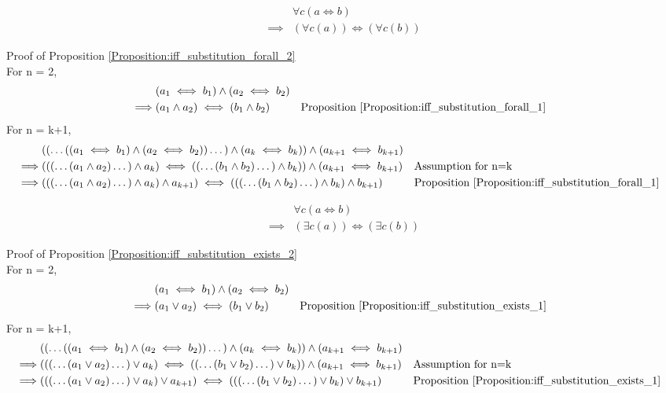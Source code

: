 \begin{prop}
\label{Proposition:iff_substitution_forall_2}
\begin{align*}
& \forall c (a \iff b) \\
\implies & (\forall c (a)) \iff (\forall c (b))
\end{align*}
\end{prop}

Proof of Proposition \ref{Proposition:iff_substitution_forall_2} \\
For n = 2,
\begin{align*}
& (a_1 \iff b_1) \land (a_2 \iff b_2) \\
\implies & (a_1 \land a_2) \iff (b_1 \land b_2)
& & \text{Proposition \ref{Proposition:iff_substitution_forall_1}} \\
\end{align*}
For n = k+1,
\begin{align*}
& (( \dots ((a_1 \iff b_1) \land (a_2 \iff b_2)) \dots ) \land (a_k \iff b_k)) \land (a_{k+1} \iff b_{k+1}) \\
\implies & ((( \dots (a_1 \land a_2) \dots ) \land a_k) \iff (( \dots (b_1 \land b_2) \dots ) \land b_k)) \land (a_{k+1} \iff b_{k+1})
& & \text{Assumption for n=k} \\
\implies & ((( \dots (a_1 \land a_2) \dots ) \land a_k) \land a_{k+1}) \iff ((( \dots (b_1 \land b_2) \dots ) \land b_k) \land b_{k+1})
& & \text{Proposition \ref{Proposition:iff_substitution_forall_1}} \\
\end{align*}

\begin{prop}
\label{Proposition:iff_substitution_exists_2}
\begin{align*}
& \forall c (a \iff b) \\
\implies & (\exists c (a)) \iff (\exists c (b))
\end{align*}
\end{prop}

Proof of Proposition \ref{Proposition:iff_substitution_exists_2} \\
For n = 2,
\begin{align*}
& (a_1 \iff b_1) \land (a_2 \iff b_2) \\
\implies & (a_1 \lor a_2) \iff (b_1 \lor b_2)
& & \text{Proposition \ref{Proposition:iff_substitution_exists_1}} \\
\end{align*}
For n = k+1,
\begin{align*}
& (( \dots ((a_1 \iff b_1) \land (a_2 \iff b_2)) \dots ) \land (a_k \iff b_k)) \land (a_{k+1} \iff b_{k+1}) \\
\implies & ((( \dots (a_1 \lor a_2) \dots ) \lor a_k) \iff (( \dots (b_1 \lor b_2) \dots ) \lor b_k)) \land (a_{k+1} \iff b_{k+1})
& & \text{Assumption for n=k} \\
\implies & ((( \dots (a_1 \lor a_2) \dots ) \lor a_k) \lor a_{k+1}) \iff ((( \dots (b_1 \lor b_2) \dots ) \lor b_k) \lor b_{k+1})
& & \text{Proposition \ref{Proposition:iff_substitution_exists_1}} \\
\end{align*}

